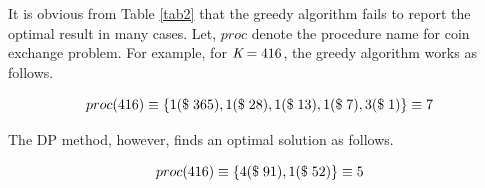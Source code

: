 \documentclass[assign]{article}
\newcommand{\xB}{\mathbf{x}}
\begin{document}
It is obvious from Table \ref{tab2} that the greedy algorithm fails to report the optimal result in many cases. Let, $proc$ denote the procedure name for coin exchange problem. For example, for $\emph{K} = 416$, the greedy algorithm works as follows.

\vspace{-10pt}
\begin{equation}
  proc(416) \equiv \{ 1 (\$ \; 365) , 1 (\$ \; 28) , 1 (\$ \; 13) , 1(\$ \; 7) , 3(\$ \; 1) \} \equiv {7} \notag
\end{equation}

The DP method, however, finds an optimal solution as follows.

\begin{equation}
  proc(416) \equiv \{ 4 (\$ \; 91) , 1 (\$ \; 52) \} \equiv {5} \notag
\end{equation}


\end{document}
